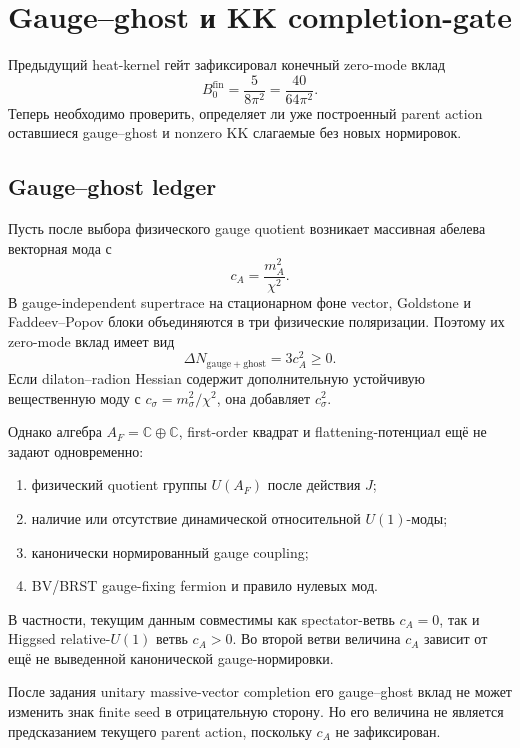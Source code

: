 \chapter{Gauge--ghost и KK completion-gate}

Предыдущий heat-kernel гейт зафиксировал конечный zero-mode вклад
\begin{equation}
 B_0^{\mathrm{fin}}=\frac5{8\pi^2}
 =\frac{40}{64\pi^2}.
\end{equation}
Теперь необходимо проверить, определяет ли уже построенный parent action
оставшиеся gauge--ghost и nonzero KK слагаемые без новых нормировок.

\section{Gauge--ghost ledger}

Пусть после выбора физического gauge quotient возникает массивная
абелева векторная мода с
\begin{equation}
 c_A=\frac{m_A^2}{\chi^2}.
\end{equation}
В gauge-independent supertrace на стационарном фоне vector, Goldstone и
Faddeev--Popov блоки объединяются в три физические поляризации. Поэтому
их zero-mode вклад имеет вид
\begin{equation}
 \Delta N_{\mathrm{gauge+ghost}}=3c_A^2\geq0.
\end{equation}
Если dilaton--radion Hessian содержит дополнительную устойчивую вещественную
моду с \(c_\sigma=m_\sigma^2/\chi^2\), она добавляет \(c_\sigma^2\).

Однако алгебра \(A_F=\mathbb C\oplus\mathbb C\), first-order квадрат и
flattening-потенциал ещё не задают одновременно:
\begin{enumerate}
 \item физический quotient группы \(U(A_F)\) после действия \(J\);
 \item наличие или отсутствие динамической относительной \(U(1)\)-моды;
 \item канонически нормированный gauge coupling;
 \item BV/BRST gauge-fixing fermion и правило нулевых мод.
\end{enumerate}
В частности, текущим данным совместимы как spectator-ветвь \(c_A=0\), так
и Higgsed relative-\(U(1)\) ветвь \(c_A>0\). Во второй ветви величина
\(c_A\) зависит от ещё не выведенной канонической gauge-нормировки.

\begin{proposition}
После задания unitary massive-vector completion его gauge--ghost вклад не
может изменить знак finite seed в отрицательную сторону. Но его величина
не является предсказанием текущего parent action, поскольку \(c_A\) не
зафиксирован.
\end{proposition}


